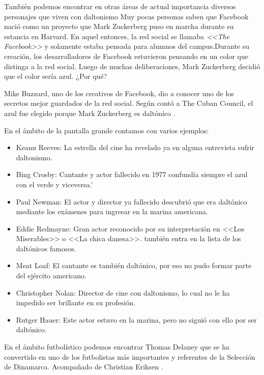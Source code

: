 \documentclass[10pt]{article}
\begin{document}
\setlength{\parskip}{2mm}

También podemos encontrar en otras áreas de actual importancia diversos personajes que viven con daltonismo 
Muy pocas personas saben que Facebook nació como un proyecto que Mark Zuckerberg puso en marcha durante su estancia en Harvard. En aquel entonces, la red social se llamaba \textit{ <<The Facebook>>} y solamente estaba pensada para alumnos del campus.Durante su creación, los desarrolladores de Facebook estuvieron pensando en un color que distinga a la red social. Luego de muchas deliberaciones, Mark Zuckerberg decidió que el color sería azul. ¿Por qué?

\setlength{\parskip}{2mm}

Mike Buzzard, uno de los creativos de Facebook, dio a conocer uno de los secretos mejor guardados de la red social. Según contó a The Cuban Council, el azul fue elegido porque Mark Zuckerberg es daltónico \cite{IEEEreferencias:Ref8}.

\setlength{\parskip}{2mm}

En el ámbito de la pantalla grande contamos con varios ejemplos: 

\setlength{\parskip}{2mm}
\begin{itemize}
    \item Keanu Reeves: La estrella del cine ha revelado ya en alguna entrevista sufrir daltonismo.
    \item Bing Crosby: Cantante y actor fallecido en 1977 confundía siempre el azul con el verde y viceversa.'
    \item Paul Newman: El actor y director ya fallecido descubrió que era daltónico mediante los exámenes para ingresar en la marina americana.
    \item Eddie Redmayne: Gran actor reconocido por su interpretación en <<Los Miserables>> o <<La chica danesa>>. también entra en la lista de los daltónicos famosos.
    \item Meat Loaf: El cantante es también daltónico, por eso no pudo formar parte del ejército americano.
    \item Christopher Nolan: Director de cine con daltonismo, lo cual no le ha impedido ser brillante en su profesión.
    \item Rutger Hauer: Este actor estuvo en la marina, pero no siguió con ello por ser daltónico.
\end{itemize}

\cite{IEEEreferencias:Ref9}

En el ámbito futbolístico podemos encontrar 
Thomas Delaney que se ha convertido en uno de los futbolistas más importantes y referentes de la Selección de Dinamarca. Acompañado de Christian Eriksen \cite{IEEEreferencias:Ref10}.
\setlength{\parskip}{2mm}
\end{document}
